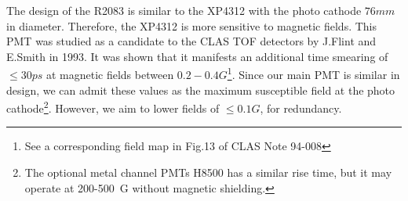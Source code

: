\documentclass[12pt]{article}
\begin{document}
The design of the R2083  is similar to the XP4312
with the photo cathode  $76mm$ in diameter. Therefore, the XP4312 is more sensitive to magnetic 
fields. This PMT was studied as a candidate to the CLAS TOF detectors by J.Flint
and E.Smith in 1993. It was shown that it    
manifests  an  additional time smearing of $\leq30ps$  at magnetic fields 
between  $0.2-0.4G$\footnote{See a corresponding field map in Fig.13 of  CLAS Note 94-008}.
Since our main PMT is similar in design, we can admit these values as
the maximum susceptible field at the photo cathode\footnote{The optional metal channel PMTs H8500 has a similar  
rise time, but it  may operate at 200-500~G  without magnetic shielding.}.
 However, we aim to lower fields of $\leq0.1G$, for redundancy.
%
\end{document}

